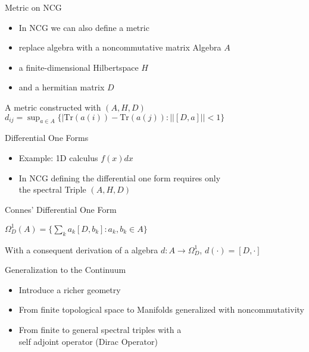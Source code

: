 \documentclass[fleqn]{beamer}
\begin{document}
    \begin{frame}{Metric on NCG}
        \begin{itemize}
            \item In NCG we can also define a metric
            \item replace algebra with a noncommutative matrix Algebra $A$
            \item a finite-dimensional Hilbertspace $H$\\
            \item and a hermitian matrix $D$
        \end{itemize}
        \begin{block}{A metric constructed with $(A, H, D)$}
            \centering
            $d_{ij} = \sup_{a \in A}\{ |\text{Tr}(a(i)) - \text{Tr}(a(j)) :
            ||[D, a]|| < 1\}$
        \end{block}
    \end{frame}

    \begin{frame}{Differential One Forms}
        \begin{itemize}
                \item Example: 1D calculus $f(x)dx$\\
                \item In NCG defining the differential one form requires only\\
                    the spectral Triple $(A, H, D)$
        \end{itemize}
        \begin{block}{Connes' Differential One Form}
            \begin{center}
                $\Omega_D^1 (A) = \{\sum_k a_k [D, b_k]: a_k, b_k \in A\}$
            \end{center}
            With a consequent derivation of a algebra
            $d: A \rightarrow \Omega_D^1$, $d(\cdot) = [D, \cdot]$
        \end{block}
   \end{frame}

    \begin{frame}{Generalization to the Continuum}
        \begin{itemize}
            \item Introduce a richer geometry
            \item From finite topological space to Manifolds generalized with noncommutativity
            \item From finite to general spectral triples with a \\
                self adjoint operator (Dirac Operator)
        \end{itemize}
    \end{frame}
\end{document}
